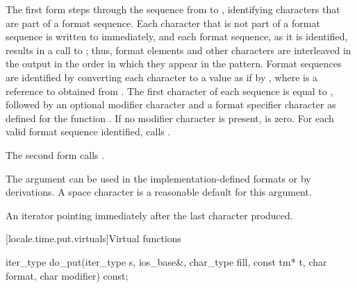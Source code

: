 \begin{itemdescr}
\pnum
\effects
The first form steps through the sequence
from  to ,
identifying characters that are part of a format sequence.
Each character that is not part of a format sequence
is written to  immediately, and
each format sequence, as it is identified, results in a call to ;
thus, format elements and other characters are interleaved in the output
in the order in which they appear in the pattern.
Format sequences are identified by converting each character  to
a  value as if by ,
where  is a reference to 
obtained from .
The first character of each sequence is equal to ,
followed by an optional modifier character 
and a format specifier character 
as defined for the function .
If no modifier character is present,  is zero.
For each valid format sequence identified,
calls .

\pnum
The second form calls .

\pnum
\begin{note}
The  argument can be used
in the implementation-defined formats or by derivations.
A space character is a reasonable default for this argument.
\end{note}

\pnum
\returns
An iterator pointing immediately after the last character produced.
\end{itemdescr}

[locale.time.put.virtuals]{Virtual functions}

%
\begin{itemdecl}
iter_type do_put(iter_type s, ios_base&, char_type fill, const tm* t,
                 char format, char modifier) const;
\end{itemdecl}

